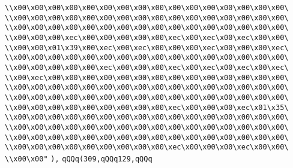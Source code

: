 \verb|\\x00\x00\x00\x00\x00\x00\x00\x00\x00\x00\x00\x00\x00\x00\x00\x00\|\newline
\verb|\\x00\x00\x00\x00\x00\x00\x00\x00\x00\x00\x00\x00\x00\x00\x00\x00\|\newline
\verb|\\x00\x00\x00\x00\x00\x00\x00\x00\x00\x00\x00\x00\x00\x00\x00\x00\|\newline
\verb|\\x00\x00\x00\xec\x00\x00\x00\x00\x00\xec\x00\xec\x00\xec\x00\x00\|\newline
\verb|\\x00\x00\x01\x39\x00\xec\x00\xec\x00\x00\x00\xec\x00\x00\x00\xec\|\newline
\verb|\\x00\x00\x00\x00\x00\x00\x00\x00\x00\x00\x00\x00\x00\x00\x00\x00\|\newline
\verb|\\x00\x00\x00\x00\x00\xec\x00\x00\x00\xec\x00\xec\x00\xec\x00\xec\|\newline
\verb|\\x00\xec\x00\x00\x00\x00\x00\x00\x00\x00\x00\x00\x00\x00\x00\x00\|\newline
\verb|\\x00\x00\x00\x00\x00\x00\x00\x00\x00\x00\x00\x00\x00\x00\x00\x00\|\newline
\verb|\\x00\x00\x00\x00\x00\x00\x00\x00\x00\x00\x00\x00\x00\x00\x00\x00\|\newline
\verb|\\x00\x00\x00\x00\x00\x00\x00\x00\x00\xec\x00\x00\x00\xec\x01\x35\|\newline
\verb|\\x00\x00\x00\x00\x00\x00\x00\x00\x00\x00\x00\x00\x00\x00\x00\x00\|\newline
\verb|\\x00\x00\x00\x00\x00\x00\x00\x00\x00\x00\x00\x00\x00\x00\x00\x00\|\newline
\verb|\\x00\x00\x00\x00\x00\x00\x00\x00\x00\x00\x00\x00\x00\x00\x00\x00\|\newline
\verb|\\x00\x00\x00\x00\x00\x00\x00\x00\x00\xec\x00\x00\x00\xec\x00\x00\|\newline
\verb|\\x00\x00"|\newline
\verb|),|\newline
\verb|qQQq(309,qQQq129,qQQq|\newline
